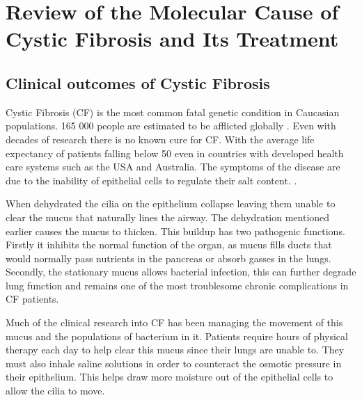 \chapter{Review of the Molecular Cause of Cystic Fibrosis and Its Treatment}
\label{chap:cftr}
\newpage
\section{Clinical outcomes of Cystic Fibrosis}
Cystic Fibrosis (CF) is the most common fatal genetic condition in Caucasian populations. 165 000 people are estimated to be afflicted globally \cite{guo2022}. Even with decades of research there is no known cure for CF. With the average life expectancy of patients falling below 50 even in countries with developed health care systems such as the USA and Australia\cite{mcbennett2022}. The symptoms of the disease are due to the inability of epithelial cells to regulate their salt content. . 

When dehydrated the cilia on the epithelium collapse leaving them unable to clear the mucus that naturally lines the airway\cite{boucher2007}. The dehydration mentioned earlier causes the mucus to thicken. This buildup has two pathogenic functions. Firstly it inhibits the normal function of the organ, as mucus fills ducts that would normally pass nutrients in the pancreas or absorb gasses in the lungs. Secondly, the stationary mucus allows bacterial infection, this can further degrade lung function and remains one of the most troublesome chronic complications in CF patients. 

Much of the clinical research into CF has been managing the movement of this mucus and the populations of bacterium in it. Patients require hours of physical therapy each day to help clear this mucus since their lungs are unable to. They must also inhale saline solutions in order to counteract the osmotic pressure in their epithelium. This helps draw more moisture out of the epithelial cells to allow the cilia to move. 

